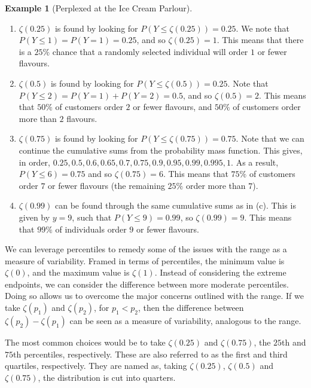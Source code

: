 \documentclass[
  letterpaper,
  DIV=11,
  numbers=noendperiod]{scrreprt}
\providecommand{\tightlist}{%
  \setlength{\itemsep}{0pt}\setlength{\parskip}{0pt}}\usepackage{longtable,booktabs,array}
\theoremstyle{definition}
\theoremstyle{definition}
\newtheorem{example}{Example}[chapter]
\theoremstyle{definition}
\theoremstyle{remark}
\begin{document}
\begin{example}[Perplexed at the Ice Cream
Parlour]
\begin{tcolorbox}[enhanced jigsaw, colback=white, colframe=quarto-callout-color-frame, arc=.35mm, leftrule=.75mm, rightrule=.15mm, opacityback=0, breakable, bottomrule=.15mm, left=2mm, toprule=.15mm]
\begin{enumerate}
\def\labelenumi{\alph{enumi}.}
\tightlist
\item
  \(\zeta(0.25)\) is found by looking for
  \(P(Y \leq \zeta(0.25)) = 0.25\). We note that
  \(P(Y \leq 1) = P(Y = 1) = 0.25\), and so \(\zeta(0.25) = 1\). This
  means that there is a \(25\%\) chance that a randomly selected
  individual will order \(1\) or fewer flavours.
\item
  \(\zeta(0.5)\) is found by looking for
  \(P(Y \leq \zeta(0.5)) = 0.25\). Note that
  \(P(Y \leq 2) = P(Y = 1) + P(Y = 2) = 0.5\), and so
  \(\zeta(0.5) = 2\). This means that \(50\%\) of customers order \(2\)
  or fewer flavours, and \(50\%\) of customers order more than \(2\)
  flavours.
\item
  \(\zeta(0.75)\) is found by looking for
  \(P(Y \leq \zeta(0.75)) = 0.75\). Note that we can continue the
  cumulative sums from the probability mass function. This gives, in
  order, \(0.25, 0.5, 0.6, 0.65, 0.7, 0.75, 0.9, 0.95, 0.99, 0.995, 1\).
  As a result, \(P(Y \leq 6) = 0.75\) and so \(\zeta(0.75) = 6\). This
  means that \(75\%\) of customers order \(7\) or fewer flavours (the
  remaining \(25\%\) order more than \(7\)).
\item
  \(\zeta(0.99)\) can be found through the same cumulative sums as in
  (c). This is given by \(y = 9\), such that \(P(Y \leq 9) = 0.99\), so
  \(\zeta(0.99) = 9\). This means that \(99\%\) of individuals order
  \(9\) or fewer flavours.
\end{enumerate}

\end{tcolorbox}

\end{example}

We can leverage percentiles to remedy some of the issues with the range
as a measure of variability. Framed in terms of percentiles, the minimum
value is \(\zeta(0)\), and the maximum value is \(\zeta(1)\). Instead of
considering the extreme endpoints, we can consider the difference
between more moderate percentiles. Doing so allows us to overcome the
major concerns outlined with the range. If we take \(\zeta(p_1)\) and
\(\zeta(p_2)\), for \(p_1 < p_2\), then the difference between
\(\zeta(p_2) - \zeta(p_1)\) can be seen as a measure of variability,
analogous to the range.

The most common choices would be to take \(\zeta(0.25)\) and
\(\zeta(0.75)\), the \(25\)th and \(75\)th percentiles, respectively.
These are also referred to as the first and third quartiles,
respectively. They are named as, taking \(\zeta(0.25)\), \(\zeta(0.5)\)
and \(\zeta(0.75)\), the distribution is cut into quarters.
\end{document}
